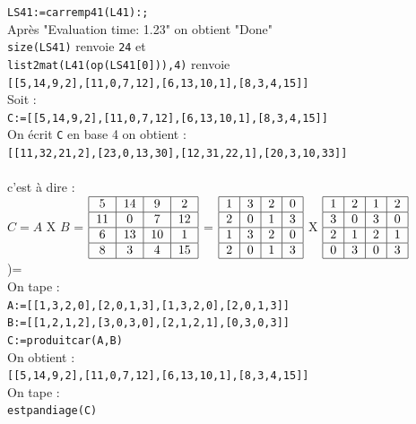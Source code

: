 \documentclass[a4paper,11pt]{book}
\begin{document}
{\tt LS41:=carremp41(L41):;}\\
Apr\`es "Evaluation time: 1.23" on obtient "Done"\\
{\tt size(LS41)} renvoie {\tt 24} et\\
{\tt list2mat(L41(op(LS41[0])),4)} renvoie \\
{\tt [[5,14,9,2],[11,0,7,12],[6,13,10,1],[8,3,4,15]]}\\
Soit : \\
{\tt C:=[[5,14,9,2],[11,0,7,12],[6,13,10,1],[8,3,4,15]]}\\
On \'ecrit {\tt C} en base 4 on obtient :\\
{\tt [[11,32,21,2],[23,0,13,30],[12,31,22,1],[20,3,10,33]]} \\
\ \\
c'est \`a dire :\\
$C=A$ X $B$ = $
\begin{tabular}{|c|c|c|c|}
\hline
5&14&9&2\\
\hline
11&0&7&12\\
\hline
6&13&10&1\\
\hline
8&3&4&15\\
\hline
\end{tabular}
$ = $
\begin{tabular}{|c|c|c|c|}
\hline
1&3&2&0\\
\hline
2&0&1&3\\
\hline
1&3&2&0\\
\hline
2&0&1&3\\
\hline
\end{tabular}
$
X $\begin{tabular}{|c|c|c|c|}
\hline
1&2&1&2\\
\hline
3&0&3&0\\
\hline
2&1&2&1\\
\hline
0&3&0&3\\
\hline
\end{tabular}
$\\)=
\ \\
On tape :\\
{\tt A:=[[1,3,2,0],[2,0,1,3],[1,3,2,0],[2,0,1,3]]}\\
{\tt B:=[[1,2,1,2],[3,0,3,0],[2,1,2,1],[0,3,0,3]]}\\
{\tt C:=produitcar(A,B)}\\
On obtient :\\
{\tt [[5,14,9,2],[11,0,7,12],[6,13,10,1],[8,3,4,15]]}\\
On tape :\\
{\tt estpandiage(C)}\\
\end{document}
